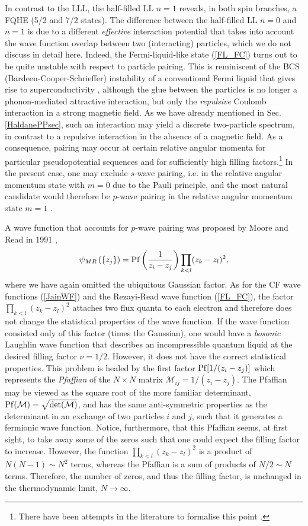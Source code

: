 \documentclass[10pt]{book}
\newcommand{\Mmath}{\mathcal{M}}
\newcommand{\beq}{\begin{equation}}
\newcommand{\eeq}{\end{equation}}
\begin{document}
In contrast to the LLL, the half-filled LL $n=1$ reveals, in both spin branches,
a FQHE (5/2 and 7/2 states). The difference between the half-filled LL $n=0$ and $n=1$ is due to a different {\sl effective}
interaction potential that takes into account the wave function overlap between two (interacting) particles, which we do not
discuss in detail here. Indeed, the Fermi-liquid-like state (\ref{FL_FC}) turns out to be quite unstable with respect to 
particle pairing. This is reminiscent of the BCS (Bardeen-Cooper-Schrieffer) instability of a conventional Fermi liquid that
gives rise to superconductivity \cite{mahan,tinkham}, although the glue between the particles is no longer a phonon-mediated
attractive interaction, but only the {\sl repulsive} Coulomb interaction in a strong magnetic field. As we have already
mentioned in Sec. \ref{HaldanePPsec}, such an interaction may yield a discrete two-particle spectrum, in contrast to a 
repulsive interaction in the absence of a magnetic field. As a consequence, pairing may occur at certain relative angular
momenta for particular pseudopotential sequences and for sufficiently high filling factors.\footnote{There have been attempts
in the literature to formalise this point \cite{HaldRez,Wojs}.} In the present case, one may exclude $s$-wave pairing,
i.e. in the relative angular momentum state with $m=0$ due to the Pauli principle, and the most natural candidate would
therefore be $p$-wave pairing in the relative angular momentum state $m=1$ \cite{GWW}. 

A wave function that accounts for $p$-wave pairing was proposed by Moore and Read in 1991 \cite{MR},
\beq\label{MRwave}
\psi_{MR}\left(\left\{z_j\right\}\right)={\rm Pf}\left(\frac{1}{z_i - z_j}\right)\prod_{k<l}(z_k - z_l)^2,
\eeq
where we have again omitted the ubiquitous Gaussian factor. As for the CF wave functions (\ref{JainWF}) and 
the Rezayi-Read wave function (\ref{FL_FC}), the factor $\prod_{k<l}(z_k - z_l)^2$ attaches two flux quanta 
to each electron and therefore does not change the statistical properties of the wave function. If the wave function
consisted only of this factor (times the Gaussian), one would have a {\sl bosonic} Laughlin wave function that
describes an incompressible quantum liquid at the desired filling factor $\nu=1/2$. However, it does not have the 
correct statistical properties. This problem is healed by the first factor ${\rm Pf}[1/(z_i - z_j)]$ which represents
the {\sl Pfaffian} of the $N\times N$ matrix $\Mmath_{ij}=1/(z_i-z_j)$. The Pfaffian may be viewed as the square root
of the more familiar determinant, ${\rm Pf}(\Mmath) = \sqrt{\det(\Mmath)}$, and has the same anti-symmetric properties
as the determinant in an exchange of two particles $i$ and $j$, such that it generates a fermionic wave function.
Notice, furthermore, that this Pfaffian seems, at first sight, to take away some of the zeros such that one could
expect the filling factor to increase. However, the function $\prod_{k<l}(z_k - z_l)^2$ is a product of
$N(N-1)\sim N^2$ terms, whereas the Pfaffian is a sum of products of $N/2\sim N$ terms. Therefore, the number of zeros,
and thus the filling factor, is unchanged in the thermodynamic limit, $N\to \infty$. 
\end{document}
